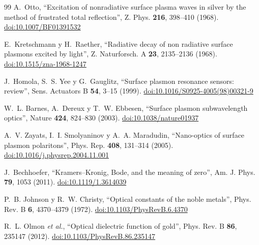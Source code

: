 \documentclass[11pt,letterpaper]{article}
\begin{document}
\begin{thebibliography}{99}
 A.~Otto, ``Excitation of nonradiative surface plasma waves in
silver by the method of frustrated total reflection'', Z. Phys. \textbf{216},
398--410 (1968).
\href{https://doi.org/10.1007/BF01391532}{doi:10.1007/BF01391532}

 E.~Kretschmann y H.~Raether, ``Radiative decay of non
radiative surface plasmons excited by light'', Z. Naturforsch. A \textbf{23},
2135--2136 (1968).
\href{https://doi.org/10.1515/zna-1968-1247}{doi:10.1515/zna-1968-1247}

 J.~Homola, S.~S. Yee y G.~Gauglitz, ``Surface plasmon
resonance sensors: review'', Sens. Actuators B \textbf{54}, 3--15 (1999).
\href{https://doi.org/10.1016/S0925-4005(98)00321-9}{doi:10.1016/S0925-4005(98)00321-9}

 W.~L. Barnes, A.~Dereux y T.~W. Ebbesen, ``Surface plasmon
subwavelength optics'', Nature \textbf{424}, 824--830 (2003).
\href{https://doi.org/10.1038/nature01937}{doi:10.1038/nature01937}

 A.~V. Zayats, I.~I. Smolyaninov y A.~A. Maradudin,
``Nano-optics of surface plasmon polaritons'', Phys. Rep. \textbf{408},
131--314 (2005).
\href{https://doi.org/10.1016/j.physrep.2004.11.001}{doi:10.1016/j.physrep.2004.11.001}

 J.~Bechhoefer, ``Kramers--Kronig, Bode, and the meaning
of zero'', Am. J. Phys. \textbf{79}, 1053 (2011).
\href{https://doi.org/10.1119/1.3614039}{doi:10.1119/1.3614039}

 P.~B. Johnson y R.~W. Christy, ``Optical constants of
the noble metals'', Phys. Rev. B \textbf{6}, 4370--4379 (1972).
\href{https://doi.org/10.1103/PhysRevB.6.4370}{doi:10.1103/PhysRevB.6.4370}

 R.~L. Olmon \emph{et al.}, ``Optical dielectric function of
gold'', Phys. Rev. B \textbf{86}, 235147 (2012).
\href{https://doi.org/10.1103/PhysRevB.86.235147}{doi:10.1103/PhysRevB.86.235147}

\end{thebibliography}
\end{document}
